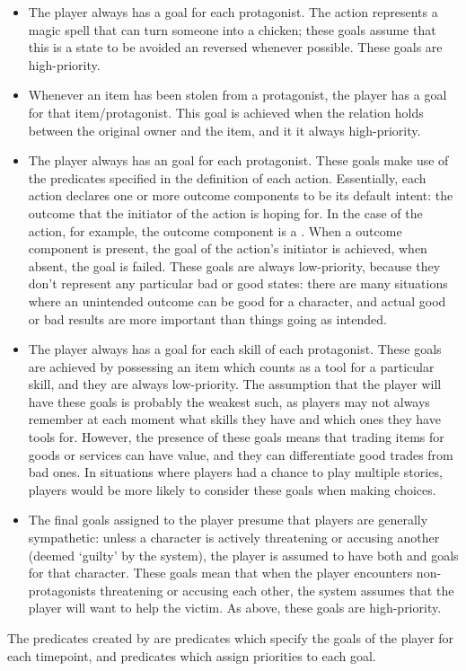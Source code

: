 \begin{enumerate}
\begin{itemize}
      \item The player always has a  goal for each protagonist. The  action represents a magic spell that can turn someone into a chicken; these goals assume that this is a state to be avoided an reversed whenever possible. These goals are high-priority.
      \item Whenever an item has been stolen from a protagonist, the player has a  goal for that item/protagonist. This goal is achieved when the  relation holds between the original owner and the item, and it it always high-priority.
      \item The player always has an  goal for each protagonist. These goals make use of the  predicates specified in the definition of each action. Essentially, each action declares one or more outcome components to be its default intent: the outcome that the initiator of the action is hoping for. In the case of the  action, for example, the outcome component  is a . When a  outcome component is present, the  goal of the action's initiator is achieved, when absent, the goal is failed. These goals are always low-priority, because they don't represent any particular bad or good states: there are many situations where an unintended outcome can be good for a character, and actual good or bad results are more important than things going as intended.
      \item The player always has a  goal for each skill of each protagonist. These goals are achieved by possessing an item which counts as a tool for a particular skill, and they are always low-priority. The assumption that the player will have these goals is probably the weakest such, as players may not always remember at each moment what skills they have and which ones they have tools for. However, the presence of these goals means that trading items for goods or services can have value, and they can differentiate good trades from bad ones. In situations where players had a chance to play multiple stories, players would be more likely to consider these goals when making choices.
      \item The final goals assigned to the player presume that players are generally sympathetic: unless a character is actively threatening or accusing another (deemed `guilty' by the system), the player is assumed to have both  and  goals for that character. These goals mean that when the player encounters non-protagonists threatening or accusing each other, the system assumes that the player will want to help the victim. As above, these goals are high-priority.
    \end{itemize}
    The predicates created by  are  predicates which specify the goals of the player for each timepoint, and  predicates which assign priorities to each goal.


\end{enumerate}
